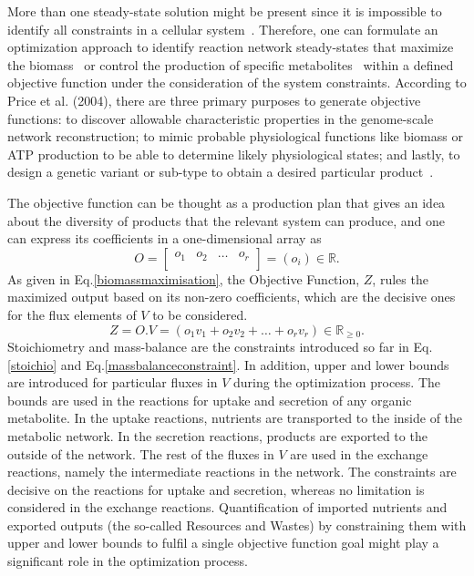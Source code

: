 More than one steady-state solution might be present since it is impossible to identify all constraints in a cellular system~\cite{KAUFFMAN2003491}. Therefore, one can formulate an optimization approach to identify reaction network steady-states that maximize the biomass~\cite{KAUFFMAN2003491,PRICE2004} or control the production of specific metabolites~\cite{VARMA1993} within a defined objective function under the consideration of the system constraints. According to Price et al. (2004),
there are three primary purposes to generate objective functions: to discover allowable characteristic properties in the genome-scale network reconstruction; to mimic probable physiological functions like biomass or ATP production to be able to determine likely physiological states; and lastly, to design a genetic variant or sub-type to obtain a desired particular product~\cite{PRICE2004}.

The objective function can be thought as a production plan that gives an idea about the diversity of products that the relevant system can produce, and one can express its coefficients in a one-dimensional array as
\begin{equation} \tag{4}
	O =  \begin{bmatrix}
		o_{1} & o_{2} & \dots  & o_{r}\\
	\end{bmatrix}=(o_{i})\in \mathbb{R}.
	\label{objectivecoefficients}
\end{equation}
As given in Eq.\eqref{biomassmaximisation}, the Objective Function, $Z$, rules the maximized output based on its non-zero coefficients, which are the decisive ones for the flux elements of $V$ to be considered.
\begin{equation} \tag{5}
	Z = O.V = (o_{1}v_{1} + o_{2}v_{2} + \dots + o_{r}v_{r})\in \mathbb{R}_{\ge0}.
	\label{biomassmaximisation}
\end{equation}
Stoichiometry and mass-balance are the constraints introduced so far in Eq.\eqref{stoichio} and Eq.\eqref{massbalanceconstraint}. In addition, upper and lower bounds are introduced for particular fluxes in $V$ during the optimization process. The bounds are used in the reactions for uptake and secretion of any organic metabolite. In the uptake reactions, nutrients are transported to the inside of the metabolic network. In the secretion reactions, products are exported to the outside of the network. The rest of the fluxes in $V$ are used in the exchange reactions, namely the intermediate reactions in the network. The constraints are decisive on the reactions for uptake and secretion, whereas no limitation is considered in the exchange reactions. Quantification of imported nutrients and exported outputs (the so-called Resources and Wastes) by constraining them with upper and lower bounds to fulfil a single objective function goal might play a significant role in the optimization process.

